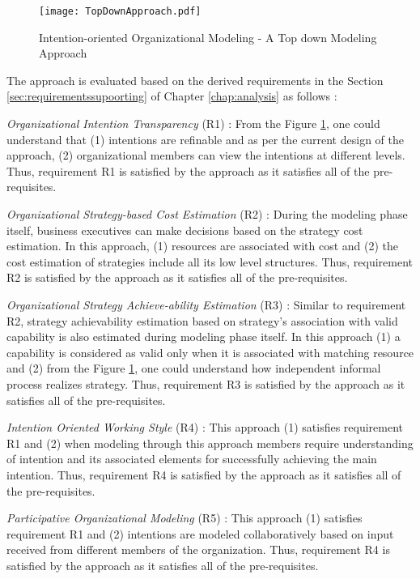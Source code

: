 \begin{figure}
	\centering
	\texttt{[image: TopDownApproach.pdf]}
	\caption{Intention-oriented Organizational Modeling - A Top down Modeling Approach}
	\label{fig:topdownapproach}
\end{figure}

The approach is evaluated based on the derived requirements in the Section \ref{sec:requirementssupoorting} of Chapter \ref{chap:analysis} as follows :

\textit{Organizational Intention Transparency} (R1) : From the Figure \ref{fig:topdownapproach}, one could understand that (1) intentions are refinable and as per the current design of the approach, (2) organizational members can view the intentions at different levels. Thus, requirement R1 is satisfied by the approach as it satisfies all of the pre-requisites. 

\textit{Organizational Strategy-based Cost Estimation} (R2) : During the modeling phase itself, business executives can make decisions based on the strategy cost estimation. In this approach, (1) resources are associated with cost and (2) the cost estimation of strategies include all its low level structures. Thus, requirement R2 is satisfied by the approach as it satisfies all of the pre-requisites. 

\textit{Organizational Strategy Achieve-ability Estimation} (R3) : Similar to requirement R2, strategy achievability estimation based on strategy's association with valid capability is also estimated during modeling phase itself. In this approach (1) a capability is considered as valid only when it is associated with matching resource and (2) from the Figure \ref{fig:topdownapproach}, one could understand how independent informal process realizes strategy. Thus, requirement R3 is satisfied by the approach as it satisfies all of the pre-requisites.

\textit{Intention Oriented Working Style} (R4) : This approach (1) satisfies requirement R1 and (2) when modeling through this approach members require understanding of intention and its associated elements for successfully achieving the main intention. Thus, requirement R4 is satisfied by the approach as it satisfies all of the pre-requisites.

\textit{Participative Organizational Modeling} (R5) : This approach (1) satisfies requirement R1 and  (2) intentions are modeled collaboratively based on input received from different members of the organization. Thus, requirement R4 is satisfied by the approach as it satisfies all of the pre-requisites. 



